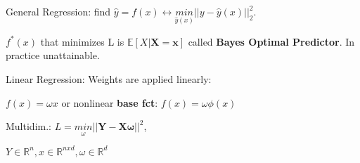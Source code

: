 General Regression: find $\hat{y} = f(x) \leftrightarrow \underset{\hat{y}(x)}{min} ||y - \hat{y}(x)||_2^2$.

$f^*(x)$ that minimizes L is $\mathbb{E}[X|\boldsymbol{X=x}]$ called \textbf{Bayes Optimal Predictor}. In practice unattainable.

Linear Regression: Weights are applied linearly:

$f(x) = \omega x$ or nonlinear \textbf{base fct}: $f(x) = \omega\phi(x)$

Multidim.: $L = \underset{\omega}{min}||\boldsymbol{Y-X\omega||}^2$, 

$Y \in \mathbb{R}^n, x \in \mathbb{R}^{nxd},\omega \in \mathbb{R}^d$





